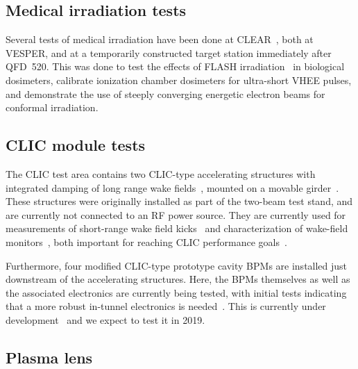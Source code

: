\documentclass[a4paper,
               keeplastbox,   %
               ]{jacow}
\begin{document}
\subsection{Medical irradiation tests}
Several tests of medical irradiation have been done at CLEAR~\cite{Wilfrid::CLEARrev}, both at VESPER, and at a temporarily constructed target station immediately after QFD~520.
This was done to test the effects of FLASH irradiation~\cite{FLASH2017} in biological dosimeters, calibrate ionization chamber dosimeters for ultra-short VHEE pulses, and demonstrate the use of steeply converging energetic electron beams for conformal irradiation.

\subsection{CLIC module tests}
The CLIC test area contains two CLIC-type accelerating structures with integrated damping of long range wake fields~\cite{Grudiev:TD26}, mounted on a movable girder~\cite{Durand-mover::AccelAlign12,Sosin-mover::IPAC12}.
These structures were originally installed as part of the two-beam test stand, and are currently not connected to an RF power source.
They are currently used for measurements of short-range wake field kicks~\cite{Antonio::IEEE-Kicks} and characterization of wake-field monitors~\cite{KyrreSjobak::CLICWS19}, both important for reaching CLIC performance goals~\cite{CLIC-CDR,CLIC-PIP}.


Furthermore, four modified CLIC-type prototype cavity BPMs are installed just downstream of the accelerating structures.
Here, the BPMs themselves as well as the associated electronics are currently being tested, with initial tests indicating that a more robust in-tunnel electronics is needed~\cite{NadenauThesis}.
This is currently under development~\cite{AlexejLyapin::CLICWS19} and we expect to test it in 2019.

\subsection{Plasma lens}
\end{document}
